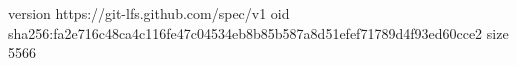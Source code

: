 version https://git-lfs.github.com/spec/v1
oid sha256:fa2e716c48ca4c116fe47c04534eb8b85b587a8d51efef71789d4f93ed60cce2
size 5566
